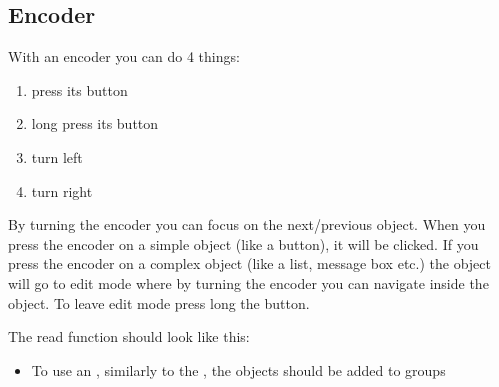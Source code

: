 \documentclass[letterpaper,10pt,english]{sphinxmanual}
\begin{document}
\subsection{Encoder}
\label{\detokenize{porting/indev:encoder}}
With an encoder you can do 4 things:
\begin{enumerate}
\item {} 
press its button

\item {} 
long press its button

\item {} 
turn left

\item {} 
turn right

\end{enumerate}

By turning the encoder you can focus on the next/previous object. When you press the encoder on a simple object (like a button), it will be clicked. If you press the encoder on a complex object (like a list, message box etc.) the object will go to edit mode where by turning the encoder you can navigate inside the object. To leave edit mode press long the button.

%
\begin{sphinxVerbatim}[commandchars=\\\{\}]
  
  
\end{sphinxVerbatim}

The read function should look like this:

%
\begin{sphinxVerbatim}[commandchars=\\\{\}]
 
    
      
      

    
\end{sphinxVerbatim}
\begin{itemize}
\item {} 
To use an , similarly to the , the objects should be added to groups

\end{itemize}
\end{document}
